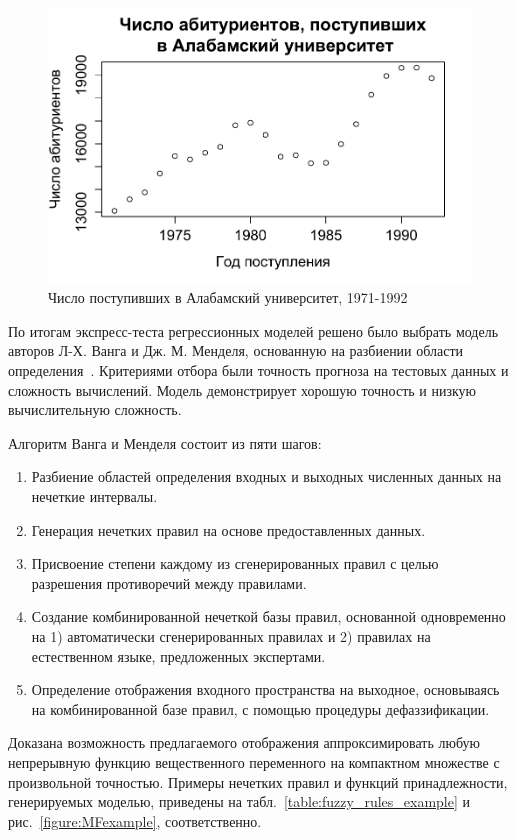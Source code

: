 \begin{figure}[bhtp]
    \includegraphics{images/UA_enrollments.pdf}
    \caption{Число поступивших в Алабамский университет, 1971-1992}		
    \label{figure:UA_enrollments}
\end{figure}

По итогам экспресс-теста регрессионных моделей решено было выбрать модель
авторов Л-Х. Ванга и Дж. М. Менделя, основанную на разбиении области
определения~\cite{Wang1992}. Критериями отбора были точность прогноза на
тестовых данных и сложность вычислений. Модель демонстрирует хорошую точность и
низкую вычислительную сложность. 

Алгоритм Ванга и Менделя состоит из пяти шагов:
\begin{enumerate}
	\item Разбиение областей определения входных и выходных численных данных на нечеткие интервалы.
	\item Генерация нечетких правил на основе предоставленных данных.
	\item Присвоение степени каждому из сгенерированных правил с целью разрешения противоречий между правилами.
	\item Создание комбинированной нечеткой базы правил, основанной одновременно на 1) автоматически сгенерированных правилах и
	   2) правилах на естественном языке, предложенных экспертами.
	
	\item Определение отображения входного пространства на выходное, основываясь на комбинированной базе правил, с помощью процедуры дефаззификации.
\end{enumerate}

Доказана возможность предлагаемого отображения аппроксимировать любую
непрерывную функцию вещественного переменного на компактном множестве с
произвольной точностью.  Примеры нечетких правил и функций принадлежности,
генерируемых моделью, приведены на табл.~\ref{table:fuzzy_rules_example} и
рис.~\ref{figure:MFexample}, соответственно.  

